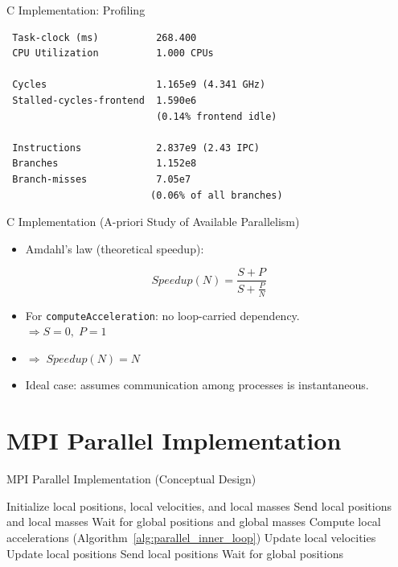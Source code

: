\documentclass{beamer}
\begin{document}
\begin{frame}[fragile]{C Implementation: Profiling}
\begin{minipage}[t]{0.48\textwidth}
{\begin{verbatim}
 Task-clock (ms)          268.400
 CPU Utilization          1.000 CPUs

 Cycles                   1.165e9 (4.341 GHz)
 Stalled-cycles-frontend  1.590e6
                          (0.14% frontend idle)

 Instructions             2.837e9 (2.43 IPC)
 Branches                 1.152e8
 Branch-misses            7.05e7
                         (0.06% of all branches)
\end{verbatim}
}
\end{minipage}

\end{frame}

\begin{frame}{C Implementation (A-priori Study of Available Parallelism)}
\begin{itemize}
  \item Amdahl's law (theoretical speedup):
\end{itemize}

\[
Speedup(N) = \frac{S+P}{S + \tfrac{P}{N}}
\]

\begin{itemize}
  \item For \texttt{computeAcceleration}: no loop-carried dependency. \\
        $\Rightarrow S=0,\; P=1$
  \item $\Rightarrow \; Speedup(N) = N$
  \item Ideal case: assumes communication among processes is instantaneous.
\end{itemize}
\end{frame}

\section{MPI Parallel Implementation}

\begin{frame}{MPI Parallel Implementation (Conceptual Design)}
\begin{algorithm}[H]
\caption{Parallel N-body (single-process view)}
\label{alg:parallel}
\begin{algorithmic}[1]
\State Initialize local positions, local velocities, and local masses
\State Send local positions and local masses
\State Wait for global positions and global masses
    \State Compute local accelerations (Algorithm~\ref{alg:parallel_inner_loop})
    \State Update local velocities
    \State Update local positions
    \State Send local positions
    \State Wait for global positions
\EndFor
\end{algorithmic}
\end{algorithm}
\end{frame}
\end{document}
